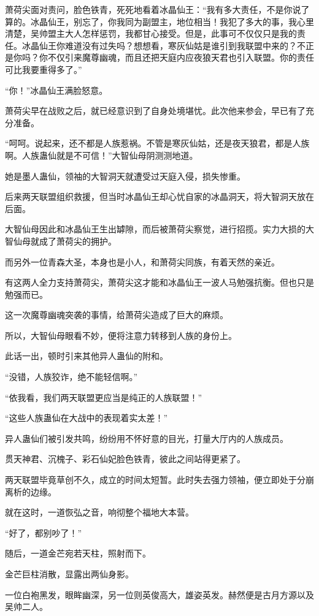 \begin{this_body}
萧荷尖面对责问，脸色铁青，死死地看着冰晶仙王：“我有多大责任，不是你说了算的。冰晶仙王，别忘了，你我同为副盟主，地位相当！我犯了多大的事，我心里清楚，吴帅盟主大人怎样惩罚，我都甘心接受。但是，此事可不仅仅只是我的责任。冰晶仙王你难道没有过失吗？想想看，寒灰仙姑是谁引到我联盟中来的？不正是你吗？你不仅引来魔尊幽魂，而且还把天庭内应夜狼天君也引入联盟。你的责任可比我要重得多了。”

“你！”冰晶仙王满脸怒意。

萧荷尖早在战败之后，就已经意识到了自身处境堪忧。此次他来参会，早已有了充分准备。

“呵呵。说起来，还不都是人族惹祸。不管是寒灰仙姑，还是夜天狼君，都是人族啊。人族蛊仙就是不可信！”大智仙母阴测测地道。

她是墨人蛊仙，领袖的大智洞天就遭受过天庭入侵，损失惨重。

后来两天联盟组织救援，但当时冰晶仙王却心忧自家的冰晶洞天，将大智洞天放在后面。

大智仙母因此和冰晶仙王生出罅隙，而后被萧荷尖察觉，进行招揽。实力大损的大智仙母就成了萧荷尖的拥护。

而另外一位青森大圣，本身也是小人，和萧荷尖同族，有着天然的亲近。

有这两人全力支持萧荷尖，萧荷尖这才能和冰晶仙王一波人马勉强抗衡。但也只是勉强而已。

这一次魔尊幽魂突袭的事情，给萧荷尖造成了巨大的麻烦。

所以，大智仙母眼看不妙，便将注意力转移到人族的身份上。

此话一出，顿时引来其他异人蛊仙的附和。

“没错，人族狡诈，绝不能轻信啊。”

“依我看，我们两天联盟更应当是纯正的人族联盟！”

“这些人族蛊仙在大战中的表现着实太差！”

异人蛊仙们被引发共鸣，纷纷用不怀好意的目光，打量大厅内的人族成员。

贯天神君、沉槐子、彩石仙妃脸色铁青，彼此之间站得更紧了。

两天联盟毕竟草创不久，成立的时间太短暂。此时失去强力领袖，便立即处于分崩离析的边缘。

就在这时，一道恢弘之音，响彻整个福地大本营。

“好了，都别吵了！”

随后，一道金芒宛若天柱，照射而下。

金芒巨柱消散，显露出两仙身影。

一位白袍黑发，眼眸幽深，另一位则英俊高大，雄姿英发。赫然便是古月方源以及吴帅二人。


\end{this_body}
